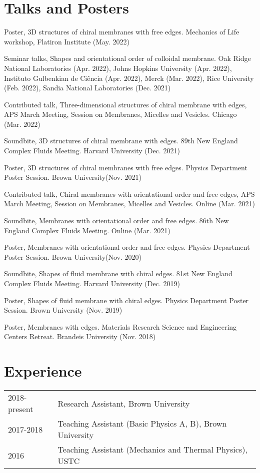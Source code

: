 \documentclass[11pt,letterpaper]{article}
\begin{document}
\section*{Talks and Posters}
\begin{etaremune}
    \item Poster, 3D structures of chiral membranes with free edges. Mechanics of Life workshop, Flatiron Institute (May. 2022)
    \item Seminar talks, Shapes and orientational order of colloidal membrane. Oak Ridge National Laboratories (Apr. 2022), Johns Hopkins University (Apr. 2022), Instituto Gulbenkian de Ciência (Apr. 2022), Merck (Mar. 2022), Rice University (Feb. 2022), Sandia National Laboratories (Dec. 2021)
    \item Contributed talk, Three-dimensional structures of chiral membrane with edges, APS March Meeting, Session on Membranes, Micelles and Vesicles. Chicago (Mar. 2022)
    \item Soundbite, 3D structures of chiral membrane with edges. 89th New England Complex Fluids Meeting. Harvard University (Dec. 2021)
    \item Poster, 3D structures of chiral membranes with free edges. Physics Department Poster Session. Brown University(Nov. 2021)
    \item Contributed talk, Chiral membranes with orientational order and free edges, APS March Meeting, Session on Membranes, Micelles and Vesicles. Online (Mar. 2021)
    \item Soundbite, Membranes with orientational order and free edges. 86th New England Complex Fluids Meeting. Online (Mar. 2021)
    \item Poster, Membranes with orientational order and free edges. Physics Department Poster Session. Brown University(Nov. 2020)
    \item Soundbite, Shapes of fluid membrane with chiral edges. 81st New England Complex Fluids Meeting. Harvard University (Dec. 2019)
    \item Poster, Shapes of fluid membrane with chiral edges. Physics Department Poster Session. Brown University (Nov. 2019)
    \item Poster, Membranes with edges. Materials Research Science and Engineering Centers Retreat. Brandeis University (Nov. 2018)
\end{etaremune}

\section*{Experience}
\vspace*{-0.15in}
\begin{longtable}{l p{\linewidth}}
    2018-present & Research Assistant, Brown University                      \\
    2017-2018    & Teaching Assistant (Basic Physics A, B), Brown University \\
    2016         & Teaching Assistant (Mechanics and Thermal Physics), USTC
\end{longtable}
\end{document}
